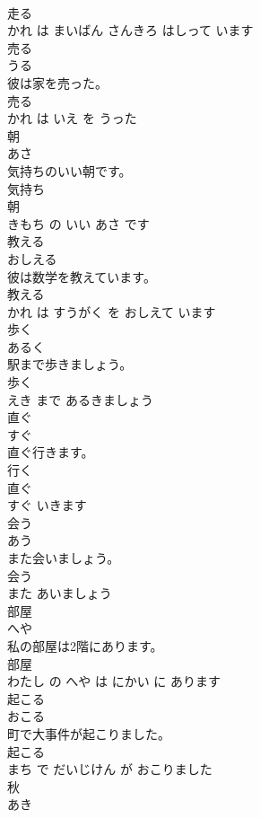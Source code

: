 \documentclass[8pt]{extreport}
\begin{document}
\begin{CJK}{UTF8}{min}
\\	走る 
\\	かれ は まいばん さんきろ はしって います			
\\	売る	
\\	うる			
\\	彼は家を売った。	
\\	売る 
\\	かれ は いえ を うった			
\\	朝	
\\	あさ			
\\	気持ちのいい朝です。	
\\	気持ち 
\\	朝 
\\	きもち の いい あさ です			
\\	教える	
\\	おしえる			
\\	彼は数学を教えています。	
\\	教える 
\\	かれ は すうがく を おしえて います			
\\	歩く	
\\	あるく			
\\	駅まで歩きましょう。	
\\	歩く 
\\	えき まで あるきましょう			
\\	直ぐ	
\\	すぐ			
\\	直ぐ行きます。	
\\	行く 
\\	直ぐ 
\\	すぐ いきます			
\\	会う	
\\	あう			
\\	また会いましょう。	
\\	会う 
\\	また あいましょう			
\\	部屋	
\\	へや			
\\	私の部屋は2階にあります。	
\\	部屋 
\\	わたし の へや は にかい に あります			
\\	起こる	
\\	おこる			
\\	町で大事件が起こりました。	
\\	起こる 
\\	まち で だいじけん が おこりました			
\\	秋	
\\	あき			

\end{CJK}
\end{document}
